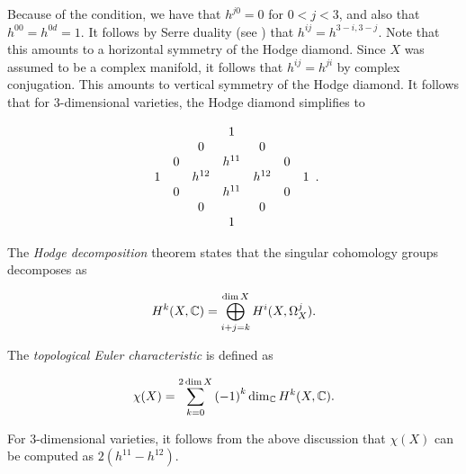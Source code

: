 Because of the \CY condition, we have that $h^{j0}=0$ for $0 < j < 3$, and also that $h^{00}=h^{0d}=1$. It follows by Serre duality (see \cite[Corollary 7.7, Chapter III]{hartshorne}) that $h^{ij}=h^{3-i,3-j}$. Note that this amounts to a horizontal symmetry of the Hodge diamond. Since $X$ was assumed to be a complex manifold, it follows that $h^{ij}=h^{ji}$ by complex conjugation. This amounts to vertical symmetry of the Hodge diamond. It follows that for 3-dimensional \CY varieties, the Hodge diamond simplifies to

\[
\begin{array}[c]{ccccccc}
&&& 1 \\  
 &         & 0 & & 0  \\
&	0 && h^{11}  && 0  \\
1 && h^{12} && h^{12} && 1 \\
&	0 && h^{11}  && 0  \\
 &         & 0 & & 0  \\
 &&& 1 
\end{array}.
\]

The \emph{Hodge decomposition} theorem \cite[page 142]{voison_cg} states that the singular cohomology groups decomposes as

$$
H^k(X,\mathbb{C}) = \bigoplus_{i+j=k}^{\dim X} H^i(X,\Omega_X^j).
$$

The \emph{topological Euler characteristic} is defined as

$$
\chi(X) = \sum_{k=0}^{2 \dim X}\left(-1\right)^k \dim_{\mathbb{C}} H^k(X, \mathbb{C}).
$$

For 3-dimensional \CY varieties, it follows from the above discussion that $\chi(X)$ can be computed as $2(h^{11} - h^{12})$. 

